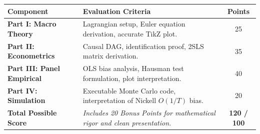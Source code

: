 \documentclass[11pt,a4paper]{article}
\begin{document}
\vspace{4pt}
\begin{tcolorbox}[
    enhanced,
    colback=SoftBg,
    colframe=NavyPrimary,
    boxrule=0.8pt,
    arc=3.5pt,
    title={\sffamily\bfseries\small \faClipboardCheck\ Problem Set Grading Rubric \& Submission Checklist},
    coltitle=white,
    colbacktitle=NavyPrimary
]
\small\sffamily
\begin{tabularx}{\textwidth}{l X c}
\toprule
\textbf{Component} & \textbf{Evaluation Criteria} & \textbf{Points} \\
\midrule
\textbf{Part I: Macro Theory} & Lagrangian setup, Euler equation derivation, accurate TikZ plot. & 25 \\
\textbf{Part II: Econometrics} & Causal DAG, identification proof, 2SLS matrix derivation. & 35 \\
\textbf{Part III: Panel Empirical} & OLS bias analysis, Hausman test formulation, plot interpretation. & 40 \\
\textbf{Part IV: Simulation} & Executable Monte Carlo code, interpretation of Nickell $O(1/T)$ bias. & 20 \\
\midrule
\textbf{Total Possible Score} & \textit{Includes 20 Bonus Points for mathematical rigor and clean presentation.} & \textbf{120 / 100} \\
\bottomrule
\end{tabularx}
\end{tcolorbox}
\end{document}

